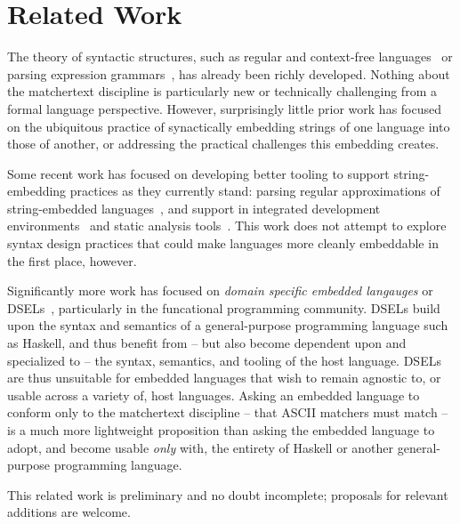\section{Related Work}
\label{sec:rel}

The theory of syntactic structures,
such as regular and
context-free languages~\cite{chomsky59algebraic}
or parsing expression grammars~\cite{ford04popl},
has already been richly developed.
Nothing about the matchertext discipline
is particularly new or technically challenging
from a formal language perspective.
However, surprisingly little prior work has focused on
the ubiquitous practice of synactically embedding
strings of one language into those of another,
or addressing the practical challenges this embedding creates.

Some recent work has focused on developing better tooling
to support string-embedding practices as they currently stand:
\eg parsing regular approximations
of string-embedded languages~\cite{verbitskaia15relaxed},
and support in
integrated development environments~\cite{grigorev14string}
and static analysis tools~\cite{khabibullin15development}.
This work does not attempt to explore syntax design practices
that could make languages more cleanly embeddable in the first place, however.

Significantly more work has focused on
\emph{domain specific embedded langauges}
or DSELs~\cite{hudak98modular},
particularly in the funcational programming community.
DSELs build upon the syntax and semantics
of a general-purpose programming language such as Haskell,
and thus benefit from --
but also become dependent upon and specialized to --
the syntax, semantics, and tooling of the host language.
DSELs are thus unsuitable for embedded languages
that wish to remain agnostic to, or usable across a variety of,
host languages.
Asking an embedded language to conform only to the matchertext discipline --
that ASCII matchers must match --
is a much more lightweight proposition than
asking the embedded language to adopt, and become usable \emph{only} with,
the entirety of Haskell or another general-purpose programming language.


This related work is preliminary and no doubt incomplete;
proposals for relevant additions are welcome.

